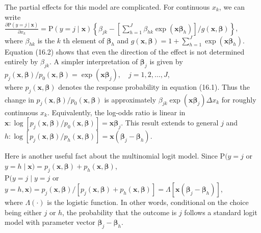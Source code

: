 \documentclass[10pt]{article}
\begin{document}
The partial effects for this model are complicated. For continuous $x_{k}$, we can write\\
$\frac{\partial \mathrm{P}(y=j \mid \mathbf{x})}{\partial x_{k}}=\mathrm{P}(y=j \mid \mathbf{x})\left\{\beta_{j k}-\left[\sum_{h=1}^{J} \beta_{h k} \exp \left(\mathbf{x} \boldsymbol{\beta}_{h}\right)\right] / g(\mathbf{x}, \boldsymbol{\beta})\right\}$,\\
where $\beta_{h k}$ is the $k$ th element of $\boldsymbol{\beta}_{h}$ and $g(\mathbf{x}, \boldsymbol{\beta})=1+\sum_{h=1}^{J} \exp \left(\mathbf{x} \boldsymbol{\beta}_{h}\right)$. Equation (16.2) shows that even the direction of the effect is not determined entirely by $\beta_{j k}$. A simpler interpretation of $\boldsymbol{\beta}_{j}$ is given by\\
$p_{j}(\mathbf{x}, \boldsymbol{\beta}) / p_{0}(\mathbf{x}, \boldsymbol{\beta})=\exp \left(\mathbf{x} \boldsymbol{\beta}_{j}\right), \quad j=1,2, \ldots, J$,\\
where $p_{j}(\mathbf{x}, \boldsymbol{\beta})$ denotes the response probability in equation (16.1). Thus the change in $p_{j}(\mathbf{x}, \boldsymbol{\beta}) / p_{0}(\mathbf{x}, \boldsymbol{\beta})$ is approximately $\beta_{j k} \exp \left(\mathbf{x} \boldsymbol{\beta}_{j}\right) \Delta x_{k}$ for roughly continuous $x_{k}$. Equivalently, the log-odds ratio is linear in $\mathbf{x}: \log \left[p_{j}(\mathbf{x}, \boldsymbol{\beta}) / p_{0}(\mathbf{x}, \boldsymbol{\beta})\right]=\mathbf{x} \boldsymbol{\beta}_{j}$. This result extends to general $j$ and $h: \log \left[p_{j}(\mathbf{x}, \boldsymbol{\beta}) / p_{h}(\mathbf{x}, \boldsymbol{\beta})\right]=\mathbf{x}\left(\boldsymbol{\beta}_{j}-\boldsymbol{\beta}_{h}\right)$.

Here is another useful fact about the multinomial logit model. Since $\mathrm{P}(y=j$ or $y=h \mid \mathbf{x})=p_{j}(\mathbf{x}, \boldsymbol{\beta})+p_{h}(\mathbf{x}, \boldsymbol{\beta})$,\\
$\mathrm{P}(y=j \mid y=j$ or $y=h, \mathbf{x})=p_{j}(\mathbf{x}, \boldsymbol{\beta}) /\left[p_{j}(\mathbf{x}, \boldsymbol{\beta})+p_{h}(\mathbf{x}, \boldsymbol{\beta})\right]=\Lambda\left[\mathbf{x}\left(\boldsymbol{\beta}_{j}-\boldsymbol{\beta}_{h}\right)\right]$,\\
where $\Lambda(\cdot)$ is the logistic function. In other words, conditional on the choice being either $j$ or $h$, the probability that the outcome is $j$ follows a standard logit model with parameter vector $\boldsymbol{\beta}_{j}-\boldsymbol{\beta}_{h}$.
\end{document}
